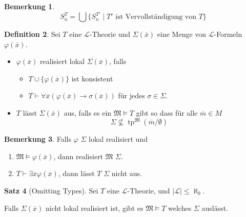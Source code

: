\documentclass[12pt,parskip=full]{scrartcl}
\newcommand{\abs}[1]{{\left| #1 \right|}}
\theoremstyle{definition}
\newtheorem{theorem}{Satz}[section]
\newtheorem{definition}[theorem]{Definition}
\newtheorem{remark}[theorem]{Bemerkung}
\begin{document}
	\begin{remark}
		\begin{equation*}
			S_n^T = \bigcup \{ S_n^{T'} \mid \text{$T'$ ist Vervollständigung von $T$} \}
		\end{equation*}
	\end{remark}

	\begin{definition}
		Sei $T$ eine $\mathcal{L}$-Theorie und $\Sigma(\overline{x})$ eine Menge von $\mathcal{L}$-Formeln $\varphi(\overline{x})$.
		
		\begin{itemize}
			\item $\varphi(\overline{x})$ realisiert lokal $\Sigma(\overline{x})$, falls
			\begin{itemize}
				\item $T \cup \{ \varphi(\overline{x}) \}$ ist konsistent
				\item $T \vdash \forall \overline{x} (\varphi(\overline{x}) \to \sigma(\overline{x}))$ für jedes $\sigma \in \Sigma$.
			\end{itemize}
			\item $T$ lässt $\Sigma(\overline{x})$ aus, falls es ein $\mathfrak{M} \models T$ gibt so dass für alle $\overline{m} \in M$
			\begin{equation*}
				\Sigma \nsubseteq \operatorname{tp}^\mathfrak{M}(\overline{m}/\emptyset)
			\end{equation*}
		\end{itemize}
	\end{definition}

	\begin{remark}
		Falls $\varphi$ $\Sigma$ lokal realisiert und
		\begin{enumerate}
			\item $\mathfrak{M} \models \varphi(\overline{x})$, dann realisiert $\mathfrak{M}$ $\Sigma$.
			\item $T \vdash \exists \overline{x} \varphi(\overline{x})$, dann lässt $T$ $\Sigma$ nicht aus.
		\end{enumerate}
	\end{remark}

	\begin{theorem}[Omitting Types]
		Sei $T$ eine $\mathcal{L}$-Theorie, und $\abs{\mathcal{L}} \leq \aleph_0$.
		
		Falls $\Sigma(\overline{x})$ nicht lokal realisiert ist, gibt es $\mathfrak{M} \models T$ welches $\Sigma$ auslässt.
	\end{theorem}
\end{document}
